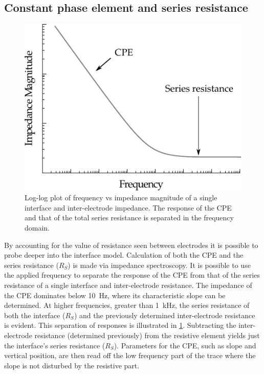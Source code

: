   \subsection{Constant phase element and series resistance}
    \begin{figure}
      \centering
      \includegraphics{content/pt2/07-InterfaceModel/graphics/graph_cpePlotGeneral}
      \caption{\label{fig:pt2-graph_cpePlotGeneral}Log-log plot of frequency vs impedance magnitude of a single interface and inter-electrode impedance. The response of the CPE and that of the total series resistance is separated in the frequency domain.}
    \end{figure}
    By accounting for the value of resistance seen between electrodes it is possible to probe deeper into the interface model.
    Calculation of both the CPE and the series resistance ($R_S$) is made via impedance spectroscopy.
    It is possible to use the applied frequency to separate the response of the CPE from that of the series resistance of a single interface and inter-electrode resistance.
    The impedance of the CPE dominates below \SI{10}{\hertz}, where its characteristic slope can be determined.
    At higher frequencies, greater than \SI{1}{\kilo\hertz}, the series resistance of both the interface ($R_S$) and the previously determined inter-electrode resistance is evident.
    This separation of responses is illustrated in \cref{fig:pt2-graph_cpePlotGeneral}.
    Subtracting the inter-electrode resistance (determined previously) from the resistive element yields just the interface's series resistance ($R_S$).
    Parameters for the CPE, such as slope and vertical position, are then read off the low frequency part of the trace where the slope is not disturbed by the resistive part.

